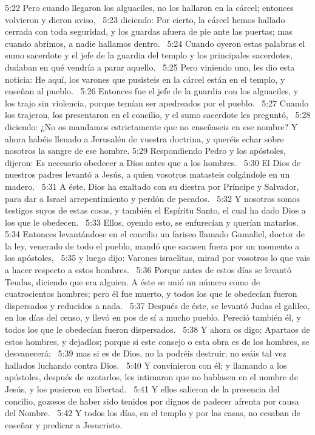5:22 Pero cuando llegaron los alguaciles, no los hallaron en la cárcel; entonces volvieron y dieron aviso,  
5:23 diciendo: Por cierto, la cárcel hemos hallado cerrada con toda seguridad, y los guardas afuera de pie ante las puertas; mas cuando abrimos, a nadie hallamos dentro.  
5:24 Cuando oyeron estas palabras el sumo sacerdote y el jefe de la guardia del templo y los principales sacerdotes, dudaban en qué vendría a parar aquello.  
5:25 Pero viniendo uno, les dio esta noticia: He aquí, los varones que pusisteis en la cárcel están en el templo, y enseñan al pueblo.  
5:26 Entonces fue el jefe de la guardia con los alguaciles, y los trajo sin violencia, porque temían ser apedreados por el pueblo.  
5:27 Cuando los trajeron, los presentaron en el concilio, y el sumo sacerdote les preguntó,  
5:28 diciendo: ¿No os mandamos estrictamente que no enseñaseis en ese nombre? Y ahora habéis llenado a Jerusalén de vuestra doctrina, y queréis echar sobre nosotros la sangre de ese hombre. 
5:29 Respondiendo Pedro y los apóstoles, dijeron: Es necesario obedecer a Dios antes que a los hombres.  
5:30 El Dios de nuestros padres levantó a Jesús, a quien vosotros matasteis colgándole en un madero.  
5:31 A éste, Dios ha exaltado con su diestra por Príncipe y Salvador, para dar a Israel arrepentimiento y perdón de pecados.  
5:32 Y nosotros somos testigos suyos de estas cosas, y también el Espíritu Santo, el cual ha dado Dios a los que le obedecen.  
5:33 Ellos, oyendo esto, se enfurecían y querían matarlos.  
5:34 Entonces levantándose en el concilio un fariseo llamado Gamaliel, doctor de la ley, venerado de todo el pueblo, mandó que sacasen fuera por un momento a los apóstoles,  
5:35 y luego dijo: Varones israelitas, mirad por vosotros lo que vais a hacer respecto a estos hombres.  
5:36 Porque antes de estos días se levantó Teudas, diciendo que era alguien. A éste se unió un número como de cuatrocientos hombres; pero él fue muerto, y todos los que le obedecían fueron dispersados y reducidos a nada.  
5:37 Después de éste, se levantó Judas el galileo, en los días del censo, y llevó en pos de sí a mucho pueblo. Pereció también él, y todos los que le obedecían fueron dispersados.  
5:38 Y ahora os digo: Apartaos de estos hombres, y dejadlos; porque si este consejo o esta obra es de los hombres, se desvanecerá;  
5:39 mas si es de Dios, no la podréis destruir; no seáis tal vez hallados luchando contra Dios.  
5:40 Y convinieron con él; y llamando a los apóstoles, después de azotarlos, les intimaron que no hablasen en el nombre de Jesús, y los pusieron en libertad.  
5:41 Y ellos salieron de la presencia del concilio, gozosos de haber sido tenidos por dignos de padecer afrenta por causa del Nombre.  
5:42 Y todos los días, en el templo y por las casas, no cesaban de enseñar y predicar a Jesucristo.  

